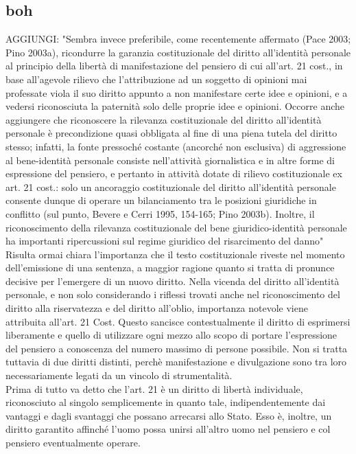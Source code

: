 \subsection{boh}
AGGIUNGI: 
"Sembra  invece  preferibile,  come  recentemente  affermato  (Pace  2003; Pino  2003a),  ricondurre  la  garanzia  costituzionale del  diritto  all’identità personale al principio della libertà di manifestazione del pensiero di cui all’art. 21 cost., in base all’agevole rilievo che l’attribuzione ad un soggetto di opinioni mai  professate  viola  il  suo  diritto  appunto  a  non  manifestare  certe  idee  e opinioni, e a vedersi riconosciuta la paternità solo delle proprie idee e opinioni. 
Occorre anche aggiungere che riconoscere la rilevanza costituzionale del diritto all’identità personale è precondizione quasi obbligata al fine di una piena tutela  del  diritto  stesso;  infatti,  la  fonte  pressoché  costante  (ancorché  non esclusiva)  di  aggressione  al  bene-identità  personale  consiste  nell’attività giornalistica e in altre forme di espressione del pensiero, e pertanto in attività dotate  di  rilievo  costituzionale  ex  art.  21  cost.: solo  un  ancoraggio costituzionale del diritto all’identità personale consente dunque di operare un bilanciamento tra le posizioni giuridiche in conflitto (sul punto, Bevere e Cerri 1995,  154-165;  Pino  2003b).  Inoltre,  il  riconoscimento  della  rilevanza costituzionale del bene giuridico-identità personale ha importanti ripercussioni sul regime giuridico del risarcimento del danno"
Risulta ormai chiara l'importanza che il testo costituzionale riveste nel momento dell'emissione di una sentenza, a maggior ragione quanto si tratta di pronunce decisive per l'emergere di un nuovo diritto. Nella vicenda del diritto all'identità personale, e non solo considerando i riflessi trovati anche nel riconoscimento del diritto alla riservatezza e del diritto all'oblio, importanza notevole viene attribuita all'art. 21 Cost.
Questo sancisce contestualmente il diritto di esprimersi liberamente e quello di utilizzare ogni mezzo allo scopo di portare l'espressione del pensiero a conoscenza del numero massimo di persone possibile. 
Non si tratta tuttavia di due diritti distinti, perchè manifestazione e divulgazione sono tra loro necessariamente legati da un vincolo di strumentalità. 
\\Prima di tutto va detto che l'art. 21 è un diritto di libertà individuale, riconosciuto al singolo semplicemente in quanto tale, indipendentemente dai vantaggi e dagli svantaggi che possano arrecarsi allo Stato. Esso è, inoltre, un diritto garantito affinché l'uomo possa unirsi all'altro uomo nel pensiero e col pensiero eventualmente operare.
